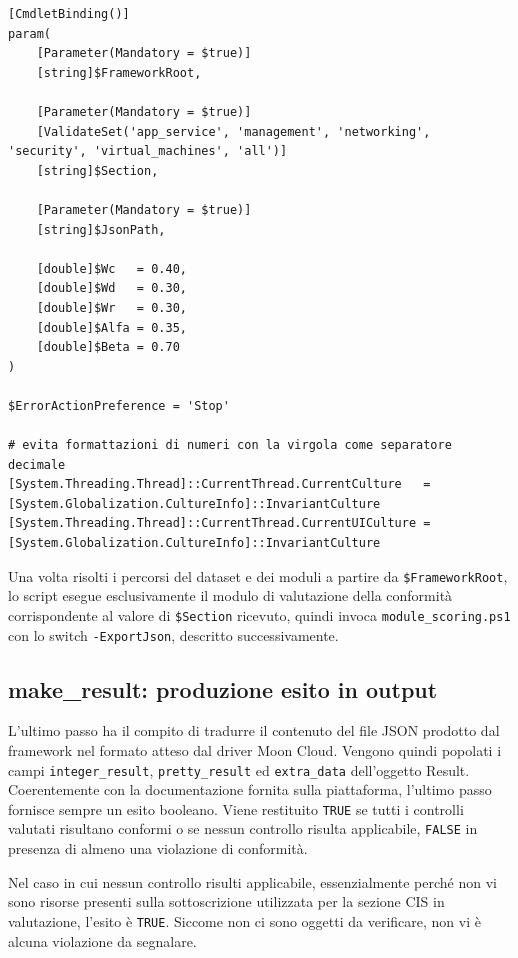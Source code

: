\documentclass[a4paper,11pt]{report}
\begin{document}
\begin{lstlisting}[style=azcli, caption={Intestazione di \texttt{probe\_runner.ps1}}, label={lst:runner-header}]
[CmdletBinding()]
param(
    [Parameter(Mandatory = $true)]
    [string]$FrameworkRoot,

    [Parameter(Mandatory = $true)]
    [ValidateSet('app_service', 'management', 'networking', 'security', 'virtual_machines', 'all')]
    [string]$Section,

    [Parameter(Mandatory = $true)]
    [string]$JsonPath,

    [double]$Wc   = 0.40,
    [double]$Wd   = 0.30,
    [double]$Wr   = 0.30,
    [double]$Alfa = 0.35,
    [double]$Beta = 0.70
)

$ErrorActionPreference = 'Stop'

# evita formattazioni di numeri con la virgola come separatore decimale
[System.Threading.Thread]::CurrentThread.CurrentCulture   = [System.Globalization.CultureInfo]::InvariantCulture
[System.Threading.Thread]::CurrentThread.CurrentUICulture = [System.Globalization.CultureInfo]::InvariantCulture
\end{lstlisting}

Una volta risolti i percorsi del dataset e dei moduli a partire da \texttt{\$FrameworkRoot}, lo script esegue esclusivamente il modulo di valutazione della conformità corrispondente al valore di \texttt{\$Section} ricevuto, quindi invoca \texttt{module\_scoring.ps1} con lo switch \texttt{-ExportJson}, descritto successivamente.


\subsection{make\_result: produzione esito in output}

L'ultimo passo ha il compito di tradurre il contenuto del file JSON prodotto dal framework nel formato atteso dal driver Moon Cloud.
Vengono quindi popolati i campi \texttt{integer\_result}, \texttt{pretty\_result} ed \texttt{extra\_data} dell'oggetto Result.\\
Coerentemente con la documentazione fornita sulla piattaforma, l'ultimo passo fornisce sempre un esito booleano.
Viene restituito \texttt{TRUE} se tutti i controlli valutati risultano conformi o se nessun controllo risulta applicabile, \texttt{FALSE} in presenza di almeno una violazione di conformità.

Nel caso in cui nessun controllo risulti applicabile, essenzialmente perché non vi sono risorse presenti sulla sottoscrizione utilizzata per la sezione CIS in valutazione, l'esito è \texttt{TRUE}.
Siccome non ci sono oggetti da verificare, non vi è alcuna violazione da segnalare.
\end{document}
